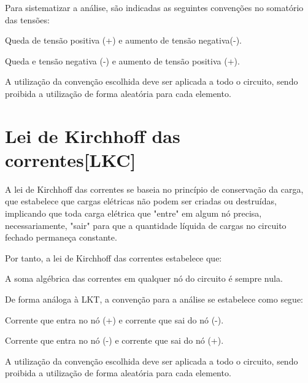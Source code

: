 \documentclass[12pt,fleqn]{book} %
\begin{document}
Para sistematizar a análise, são indicadas as seguintes convenções no somatório das tensões:

\begin{remark}
 Queda de tensão positiva (+) e aumento de tensão negativa(-).
\end{remark}

\begin{remark}
Queda e tensão negativa (-) e aumento de tensão positiva (+).
\end{remark}

\begin{remark}
A utilização da convenção escolhida deve ser aplicada a todo o circuito, sendo proibida a utilização de forma aleatória para cada elemento.
\end{remark}
    
    \section{Lei de Kirchhoff das correntes[LKC]}
    
    A lei de Kirchhoff das correntes se baseia no princípio de conservação da carga, que estabelece que cargas elétricas não podem ser criadas ou destruídas, implicando que toda carga elétrica que "entre" em algum nó precisa, necessariamente, "sair" para que a quantidade líquida de cargas no circuito fechado permaneça constante.
    
    Por tanto, a lei de Kirchhoff das correntes estabelece que:
    
    \begin{definition}[LKT]
    A soma algébrica das correntes em qualquer nó do circuito é sempre nula.
    \end{definition}
    
    De forma análoga à LKT, a convenção para a análise se estabelece como segue:
    
    \begin{remark}
 Corrente que entra no nó (+) e corrente que sai do nó (-).
    \end{remark}

    \begin{remark}
 Corrente que entra no nó (-) e corrente que sai do nó (+).
    \end{remark}

    \begin{remark}
A utilização da convenção escolhida deve ser aplicada a todo o circuito, sendo proibida a utilização de forma aleatória para cada elemento.
    \end{remark}
    
\end{document}
